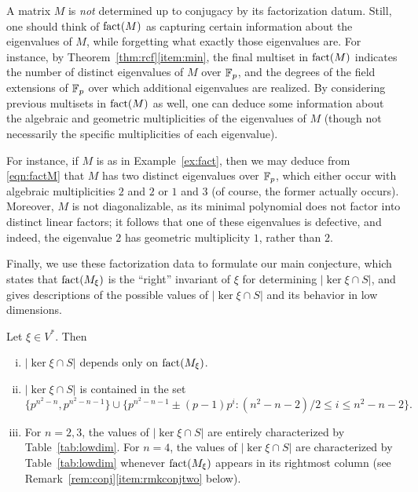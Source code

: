 \begin{rem}
A matrix $M$ is \emph{not} determined up to conjugacy by its factorization datum. Still, one should think of $\operatorname{fact}(M)$ as capturing certain information about the eigenvalues of $M$, while forgetting what exactly those eigenvalues are. For instance, by Theorem~\ref{thm:rcf}\eqref{item:min}, the final multiset in $\operatorname{fact}(M)$ indicates the number of distinct eigenvalues of $M$ over $\mathbb{F}_p$, and the degrees of the field extensions of $\mathbb{F}_p$ over which additional eigenvalues are realized. By considering previous multisets in $\operatorname{fact}(M)$ as well, one can deduce some information about the algebraic and geometric multiplicities of the eigenvalues of $M$ (though not necessarily the specific multiplicities of each eigenvalue).

For instance, if $M$ is as in Example~\ref{ex:fact}, then we may deduce from \eqref{eqn:factM} that $M$ has two distinct eigenvalues over $\mathbb{F}_p$, which either occur with algebraic multiplicities $2$ and $2$ or $1$ and $3$ (of course, the former actually occurs). Moreover, $M$ is not diagonalizable, as its minimal polynomial does not factor into distinct linear factors; it follows that one of these eigenvalues is defective, and indeed, the eigenvalue $2$ has geometric multiplicity $1$, rather than $2$.
\end{rem}

Finally, we use these factorization data to formulate our main conjecture, which states that $\operatorname{fact}(M_\xi)$ is the ``right'' invariant of $\xi$ for determining $|\ker\xi\cap S|$, and gives descriptions of the possible values of $|\ker\xi\cap S|$ and its behavior in low dimensions.

\begin{conj}
\label{conj:main}
Let $\xi\in V^*$. Then
\begin{enumerate}[(i)]
\item $|\ker\xi\cap S|$ depends only on $\operatorname{fact}(M_\xi)$.
\item $|\ker\xi\cap S|$ is contained in the set
\begin{equation}
\label{eqn:conjvalset}
\{p^{n^2-n},p^{n^2-n-1}\}\cup\{p^{n^2-n-1}\pm(p-1)p^i:(n^2-n-2)/2\le i\le n^2-n-2\}.
\end{equation}\label{item:conjvals}
\item For $n=2,3$, the values of $|\ker\xi\cap S|$ are entirely characterized by Table~\ref{tab:lowdim}. For $n=4$, the values of $|\ker\xi\cap S|$ are characterized by Table~\ref{tab:lowdim} whenever $\operatorname{fact}(M_\xi)$ appears in its rightmost column (see Remark~\ref{rem:conj}\eqref{item:rmkconjtwo} below).\label{item:conjlown}
\end{enumerate}
\end{conj}



